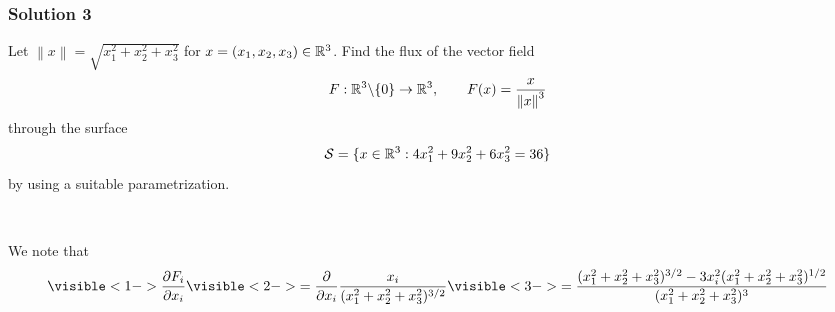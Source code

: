 \documentclass[10pt, t, allowdisplaybreaks]{beamer}
\newcommand{\nullspacesmall}{~\vspace{1em}}
\begin{document}
\begin{frame}
    \frametitle{Solution 3}
    \par Let $\left\lVert x\right\rVert = \sqrt{x_1^2+x_2^2+x_3^2}$ for $x = (x_1, x_2, x_3) \in \mathbb{R}^3$. Find the flux of the vector field
    \begin{equation*}
        F:\mathbb{R}^3\backslash\{0\}\rightarrow\mathbb{R}^3, \qquad F(x) = \frac{x}{\left\lVert x\right\rVert^3 }
    \end{equation*}
    through the surface 
    \begin{equation*}
        \mathcal{S} = \{x\in \mathbb{R}^3: 4x_1^2 + 9x_2^2 + 6x_3^2 = 36\}
    \end{equation*}
    by using a suitable parametrization. 

    \nullspacesmall
    
    \par We note that 
    \begin{equation*}
        \visible<1->{
            \frac{\partial F_i}{\partial x_i}
        }
        \visible<2->{
            = \frac{\partial }{\partial x_i}\frac{x_i}{(x_1^2+x_2^2+x_3^2)^{3/2}}
        }
        \visible<3->{
            = \frac{(x_1^2+x_2^2+x_3^2)^{3/2} - 3x_i^2(x_1^2+x_2^2+x_3^2)^{1/2}}{(x_1^2+x_2^2+x_3^2)^{3}}
        }          
    \end{equation*}
\end{frame}
\end{document}
